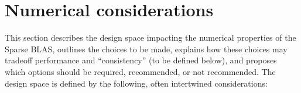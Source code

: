 \documentclass{article}
\newcommand{\JimD}[1]{{\color{red}(Jim D) #1}}
\newcommand{\ignore}[1]{}
\begin{document}
\section{Numerical considerations}


This section describes the design space impacting the
numerical properties of the Sparse BLAS, outlines the
choices to be made, explains how these choices may tradeoff performance and ``consistency'' (to be defined below), 
and proposes which options should be required, recommended, 
or not recommended. 
The design space is defined by the following, often intertwined considerations:

\end{document}
